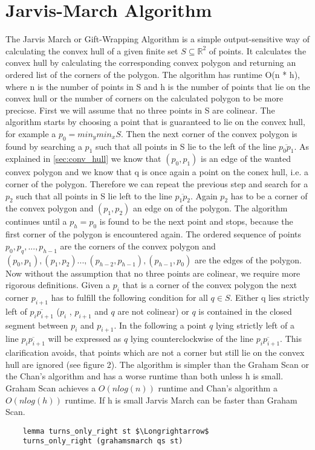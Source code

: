 \section{Jarvis-March Algorithm}
The Jarvis March or Gift-Wrapping Algorithm is a simple output-sensitive way of calculating
the convex hull of a given finite set $S \subseteq \mathbb{R}^2$ of points. It calculates the
convex hull by calculating the corresponding convex polygon and returning
an ordered list of the corners of the polygon. The algorithm has runtime O(n * h), where n 
is the number of points in S and h is the number of points that lie on the convex hull or
the number of corners on the calculated polygon to be more precicse. 
First we will assume that no three points in S are colinear.
The algorithm starts by choosing a point that is guaranteed to lie on the convex hull, 
for example a $p_0 = min_y min_x S$. Then the next corner of the convex polygon
is found by searching a $p_1$ such that all points in S lie to the left of the 
line $\overline{p_0 p_1}$. As explained in \ref{sec:conv_hull} we know that $(p_0,p_1)$ is 
an edge of the wanted convex polygon and we know that q is once again a point on
the conex hull, i.e. a corner of the polygon. Therefore we can repeat the previous step
and search for a $p_2$ such that all points in S lie left to the line $\overline{p_1 p_2}$.
Again $p_2$ has to be a corner of the convex polygon and $(p_1,p_2)$ an edge on of the
polygon. The algorithm continues until a $p_h = p_0$ is found to be the next point and
stops, because the first corner of the polygon is encountered again. 
The ordered sequence of points $p_0,p_q, ... , p_{h-1}$ are the corners of the convex polygon 
and $(p_0,p_1),(p_1,p_2) ... ,(p_{h-2},p_{h-1}), (p_{h-1},p_0)$ are the edges of the polygon.
Now without the assumption that no three points are colinear, we require more rigorous definitions.
Given a $p_i$ that is a corner of the convex polygon the next corner $p_{i+1}$ 
has to fulfill the following condition for all $q \in S$.
Either q lies strictly left of $\overline{p_i p_{i+1}}$ ($p_i$
, $p_{i+1}$ and $q$ are not colinear) or $q$ is contained in the closed
segment between $p_i$ and $p_{i+1}$. In the following  a point $q$ lying strictly
left of a line $\overline{p_i p_{i+1}}$ will be expressed as $q$ lying
counterclockwise of the line $\overline{p_i p_{i+1}}$. This clarification avoids, that
points which are not a corner but still lie on the convex hull are ignored (see figure 2).    
The algorithm is simpler than the Graham Scan or the Chan's algorithm and has a worse
runtime than both unless h is small. Graham Scan achieves a $O(n log(n))$ runtime and 
Chan's algorithm a $O(n log(h))$ runtime. If h is small Jarvis March 
can be faster than Graham Scan.
\begin{lstlisting}
    lemma turns_only_right st $\Longrightarrow$
    turns_only_right (grahamsmarch qs st)
\end{lstlisting}
    

